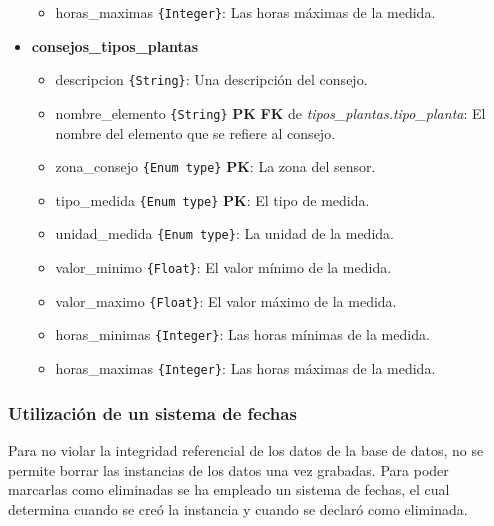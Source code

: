 \begin{itemize}
\begin{itemize}
                \item horas\_maximas \texttt{\{Integer\}}: Las horas máximas de la medida.
            \end{itemize}
            \item \textbf{consejos\_tipos\_plantas}
            \begin{itemize}
                \item descripcion \texttt{\{String\}}: Una descripción del consejo.
                \item nombre\_elemento \texttt{\{String\}} \textbf{PK} \textbf{FK} de \textit{tipos\_plantas.tipo\_planta}: El nombre del elemento que se refiere al consejo.
                \item zona\_consejo \texttt{\{Enum type\}} \textbf{PK}: La zona del sensor.
                \item tipo\_medida \texttt{\{Enum type\}} \textbf{PK}: El tipo de medida.
                \item unidad\_medida \texttt{\{Enum type\}}: La unidad de la medida.
                \item valor\_minimo \texttt{\{Float\}}: El valor mínimo de la medida.
                \item valor\_maximo \texttt{\{Float\}}: El valor máximo de la medida.
                \item horas\_minimas \texttt{\{Integer\}}: Las horas mínimas de la medida.
                \item horas\_maximas \texttt{\{Integer\}}: Las horas máximas de la medida.
            \end{itemize}
        \end{itemize}

    \subsubsection{Utilización de un sistema de fechas}
    Para no violar la integridad referencial de los datos de la base de datos, no se permite borrar las instancias de los datos una vez grabadas. Para poder marcarlas como eliminadas se ha empleado un sistema de fechas, el cual determina cuando se creó la instancia y cuando se declaró como eliminada.

  

